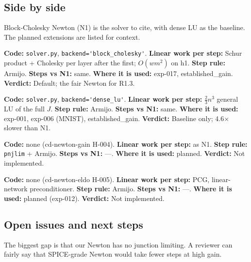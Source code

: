 \documentclass[11pt,a4paper]{article}
\begin{document}
\subsection*{Side by side}

Block-Cholesky Newton (N1) is the solver to cite, with dense LU as the baseline. The
planned extensions are listed for context.

\begin{description}[style=nextline]
\item[Block Cholesky (N1)]
\textbf{Code:} \nolinkurl{solver.py}, \nolinkurl{backend='block_cholesky'}.
\textbf{Linear work per step:} Schur product + Cholesky per layer after the first;
$O(wm^2)$ on h1. \textbf{Step rule:} Armijo. \textbf{Steps vs N1:} same. \textbf{Where
it is used:} exp-017, established\_gain. \textbf{Verdict:} Default; the fair Newton for
R1.3.
\item[Dense LU]
\textbf{Code:} \nolinkurl{solver.py}, \nolinkurl{backend='dense_lu'}. \textbf{Linear
work per step:} $\frac{2}{3}n^3$ general LU of the full $J$. \textbf{Step rule:} Armijo.
\textbf{Steps vs N1:} same. \textbf{Where it is used:} exp-001, exp-006 (MNIST),
established\_gain. \textbf{Verdict:} Baseline only; 4.6\ensuremath{\times} slower than
N1.
\item[Junction-limited]
\textbf{Code:} none (cd-newton-gain H-004). \textbf{Linear work per step:} as N1.
\textbf{Step rule:} \nolinkurl{pnjlim} + Armijo. \textbf{Steps vs N1:} ---.
\textbf{Where it is used:} planned. \textbf{Verdict:} Not implemented.
\item[Newton--Krylov]
\textbf{Code:} none (cd-newton-eldo H-005). \textbf{Linear work per step:} PCG,
linear-network preconditioner. \textbf{Step rule:} Armijo. \textbf{Steps vs N1:} ---.
\textbf{Where it is used:} planned (exp-012). \textbf{Verdict:} Not implemented.
\end{description}

\subsection*{Open issues and next steps}

The biggest gap is that our Newton has no junction limiting. A reviewer can fairly say
that SPICE-grade Newton would take fewer steps at high gain.
\end{document}

